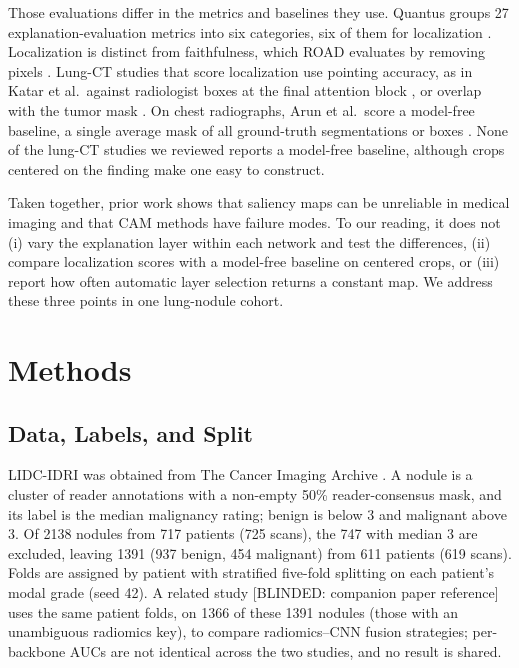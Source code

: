 \documentclass[conference]{IEEEtran}
\begin{document}
Those evaluations differ in the metrics and baselines they use. Quantus groups 27 explanation-evaluation metrics into six categories, six of them for localization \cite{hedstrom_quantus_2023}. Localization is distinct from faithfulness, which ROAD evaluates by removing pixels \cite{rong_road_2022}. Lung-CT studies that score localization use pointing accuracy, as in Katar et al.\ against radiologist boxes at the final attention block \cite{katar_transformer_2026}, or overlap with the tumor mask \cite{panboonyuen_seeing_2026}. On chest radiographs, Arun et al.\ score a model-free baseline, a single average mask of all ground-truth segmentations or boxes \cite{arun_trustworthiness_2021}. None of the lung-CT studies we reviewed reports a model-free baseline, although crops centered on the finding make one easy to construct.

Taken together, prior work shows that saliency maps can be unreliable in medical imaging and that CAM methods have failure modes. To our reading, it does not (i) vary the explanation layer within each network and test the differences, (ii) compare localization scores with a model-free baseline on centered crops, or (iii) report how often automatic layer selection returns a constant map. We address these three points in one lung-nodule cohort.

\section{Methods}\label{sec:methods}

\subsection{Data, Labels, and Split}\label{sec:data}
LIDC-IDRI \cite{armato_lidcidri_2011} was obtained from The Cancer Imaging Archive \cite{clark_tcia_2013}. A nodule is a cluster of reader annotations with a non-empty 50\% reader-consensus mask, and its label is the median malignancy rating; benign is below 3 and malignant above 3. Of 2138 nodules from 717 patients (725 scans), the 747 with median 3 are excluded, leaving 1391 (937 benign, 454 malignant) from 611 patients (619 scans). Folds are assigned by patient with stratified five-fold splitting on each patient's modal grade (seed 42). A related study [BLINDED: companion paper reference] uses the same patient folds, on 1366 of these 1391 nodules (those with an unambiguous radiomics key), to compare radiomics--CNN fusion strategies; per-backbone AUCs are not identical across the two studies, and no result is shared.
\end{document}
